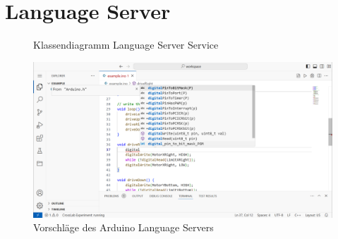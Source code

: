 \section{Language Server}\label{section:prototypische-implementierung:language-server}

\begin{figure}[tbp]
    \centering
    \caption{Klassendiagramm Language Server Service}
    \label{figure:klassendiagramm-language-server-service}
\end{figure}

\begin{figure}[tbp]
    \centering
    \includegraphics[trim={0 0 0 0},clip,width=\textwidth]{images/language-server.png}
    \caption{Vorschläge des Arduino Language Servers}
    \label{figure:benutzerinterface:language-server}
\end{figure}

